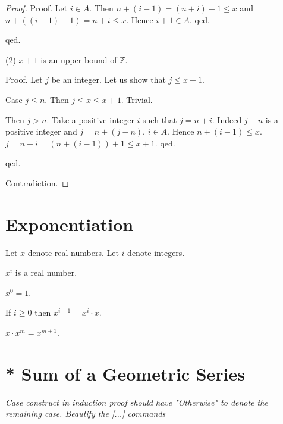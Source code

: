 \documentclass{article}
\begin{document}
\begin{forthel}
\begin{proof}
  Proof. Let $i \in A$. Then
  $n + (i -1) = (n + i) - 1 \leq x$ and
  $n + ((i + 1) - 1) = n + i \leq x$.
  Hence $i + 1 \in A$.
  qed.

qed.

(2) $x + 1$ is an upper bound of $\mathbb{Z}$.

Proof.
Let $j$ be an integer. Let us show that $j \leq x + 1$.

Case $j \leq n$. Then $j \leq x \leq x + 1$. Trivial.

Then $j > n$. Take a positive integer $i$
such that $j = n + i$. 
Indeed $j - n$ is a positive integer and  
$j = n + (j-n)$.
$i \in A$.
Hence $n + (i-1) \leq x$. $j = n+i = (n + (i-1)) + 1 \leq x + 1$.
qed.

qed.

Contradiction.
\end{proof}



\end{forthel}

\section{Exponentiation}

\begin{forthel}
Let $x$ denote real numbers.
Let $i$ denote integers.

\begin{signature} $x^{i}$ is a real number.
\end{signature}

\begin{axiom} $x^{0} = 1$. \end{axiom}

\begin{axiom} If $i \geq 0$ then $x^{i+1} = x^{i} \cdot x$.
\end{axiom}

\begin{lemma}
$x \cdot x^{m} = x^{m+1}$.
\end{lemma}

\end{forthel}

\section{* Sum of a Geometric Series}

\newcommand{\sumgeom}[2]{\sum_{0 \leq i < #2} {#1}^i}

{\em Case construct in induction proof should have 
"Otherwise" to denote the remaining case. Beautify the 
[...] commands}
\end{document}
